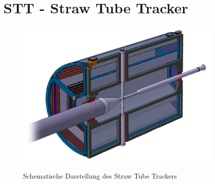 \section{STT - Straw Tube Tracker}
\begin{figure}
  \includegraphics[width=0.9\textwidth]{Bilder/panda_stt}
	\label{fig:panda_stt}
	\caption{Schematische Darstellung des Straw Tube Trackers}
\end{figure}

